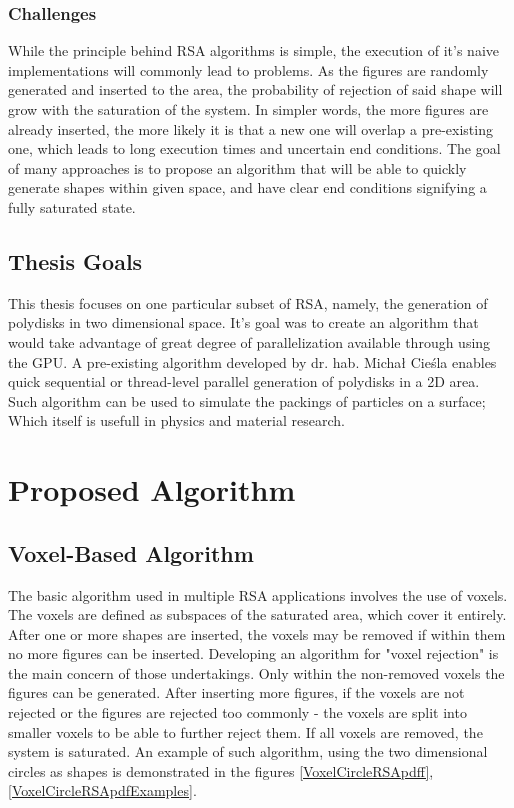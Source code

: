 \documentclass[12pt, oneside]{report}
\begin{document}
\subsection {Challenges}

While the principle behind RSA algorithms is simple, the execution of it's naive implementations will commonly lead to problems. As the figures are randomly generated and inserted to the area, the probability of rejection of said shape will grow with the saturation of the system. In simpler words, the more figures are already inserted, the more likely it is that a new one will overlap a pre-existing one, which leads to long execution times and uncertain end conditions. The goal of many approaches is to propose an algorithm that will be able to quickly generate shapes within given space, and have clear end conditions signifying a fully saturated state.

\section {Thesis Goals}

This thesis focuses on one particular subset of RSA, namely, the generation of polydisks in two dimensional space. It's goal was to create an algorithm that would take advantage of great degree of parallelization available through using the GPU. A pre-existing algorithm developed by dr. hab. Michał Cieśla enables quick sequential or thread-level parallel generation of polydisks in a 2D area. Such algorithm can be used to simulate the packings of particles on a surface; Which itself is usefull in physics and material research.\autocite[1]{ciesla}


\chapter{Proposed Algorithm}

\section {Voxel-Based Algorithm}

The basic algorithm used in multiple RSA applications involves the use of voxels. The voxels are defined as subspaces of the saturated area, which cover it entirely. After one or more shapes are inserted, the voxels may be removed if within them no more figures can be inserted. Developing an algorithm for "voxel rejection" is the main concern of those undertakings. Only within the non-removed voxels the figures can be generated. After inserting more figures, if the voxels are not rejected or the figures are rejected too commonly - the voxels are split into smaller voxels to be able to further reject them. If all voxels are removed, the system is saturated. An example of such algorithm, using the two dimensional circles as shapes is demonstrated in the figures \ref{VoxelCircleRSApdff}, \ref{VoxelCircleRSApdfExamples}.
\end{document}
